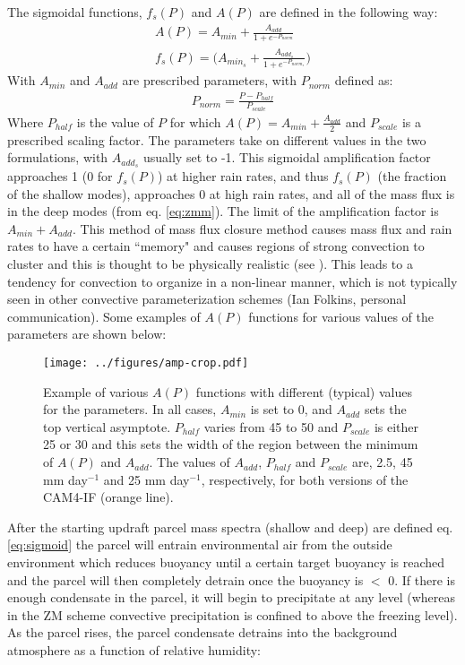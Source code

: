 \documentclass[letterpaper,12pt,titlepage,oneside,final]{book}
\begin{document}
The sigmoidal functions, $f_{s}(P)$ and $A(P)$ are defined in the following way:
\begin{align}\label{eq:sigmoid}
A(P)=A_{min}+\frac{A_{add}}{1+e^{-P_{norm}}}
\\
f_{s}(P)=\Big(A_{min_{s}}+\frac{A_{add_{s}}}{1+e^{-P_{norm_{s}}}}\Big)
\end{align}
With $A_{min}$ and $A_{add}$ are prescribed parameters, with $P_{norm}$ defined as:
\begin{align}
P_{norm}=\frac{P-P_{half}}{P_{scale}}
\end{align}
Where $P_{half}$ is the value of $P$ for which $A(P) = A_{min} + \frac{A_{add}}{2}$ and $P_{scale}$ is a prescribed scaling factor. The parameters take on different values in the two formulations, with $A_{add_{s}}$ usually set to -1. This sigmoidal amplification factor approaches 1 (0 for $f_{s}(P)$) at higher rain rates, and thus $f_{s}(P)$ (the fraction of the shallow modes), approaches 0 at high rain rates, and all of the mass flux is in the deep modes (from eq. \ref{eq:zmm}). The limit of the amplification factor is $A_{min} + A_{add}$. This method of mass flux closure method causes mass flux and rain rates to have a certain ``memory" and causes regions of strong convection to cluster and this is thought to be physically realistic (see \cite{mapes_gregarious_1993}). This leads to a tendency for convection to organize in a non-linear manner, which is not typically seen in other convective parameterization schemes (Ian Folkins, personal communication). Some examples of $A(P)$ functions for various values of the parameters are shown below:
\begin{figure}[H]
\centering
\noindent\texttt{[image: ../figures/amp-crop.pdf]}\hfill
\caption{\footnotesize Example of various $A(P)$ functions with different (typical) values for the parameters. In all cases, $A_{min}$ is set to 0, and $A_{add}$ sets the top vertical asymptote. $P_{half}$ varies from 45 to 50 and $P_{scale}$ is either 25 or 30 and this sets the width of the region between the minimum of $A(P)$ and $A_{add}$. The values of $A_{add}$, $P_{half}$ and $P_{scale}$ are, 2.5, 45 mm day$^{-1}$ and 25 mm day$^{-1}$, respectively, for both versions of the CAM4-IF (orange line).}
\label{fig:sigmoid}
\end{figure}
After the starting updraft parcel mass spectra (shallow and deep) are defined eq. \ref{eq:sigmoid} the parcel will entrain environmental air from the outside environment which reduces buoyancy until a certain target buoyancy is reached and the parcel will then completely detrain once the buoyancy is $<$ 0. If there is enough condensate in the parcel, it will begin to precipitate at any level (whereas in the ZM scheme convective precipitation is confined to above the freezing level). As the parcel rises, the parcel condensate detrains into the background atmosphere as a function of relative humidity:
\end{document}
